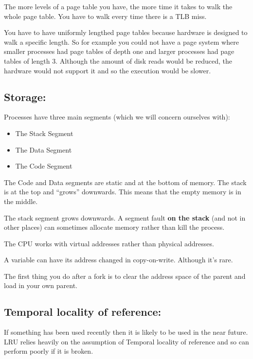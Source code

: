 \documentclass[10pt,\jkfside,a4paper]{article}
\begin{document}
The more levels of a page table you have, the more time it takes to walk the whole 
page table. You have to walk every time there is a TLB miss.

You have to have uniformly lengthed page tables because hardware is designed to walk a 
specific length. So for example you could not have a page system where smaller processes 
had page tables of depth one and larger processes had page tables of length 3. Although 
the amount of disk reads would be reduced, the hardware would not support it and so 
the execution would be slower.

\subsection*{Storage:}

Processes have three main segments (which we will concern ourselves with):
\begin{itemize}

\item The Stack Segment

\item The Data Segment

\item The Code Segment

\end{itemize}

The Code and Data segments are static and at the bottom of memory. The stack is at the 
top and ``grows'' downwards. This means that the empty memory is in the middle.

The stack segment grows downwards. A segment fault \textbf{on the stack} (and 
not in other places) can sometimes allocate memory rather than kill the process.

The CPU works with virtual addresses rather than physical addresses.

A variable can have its address changed in copy-on-write. Although it's rare.

The first thing you do after a fork is to clear the address space of the parent 
and load in your own parent.

\subsection*{Temporal locality of reference:} 
If something has been used recently then it is likely to be used in the near 
future. LRU relies heavily on the assumption of Temporal locality of 
reference and so can perform poorly if it is broken.
\end{document}
